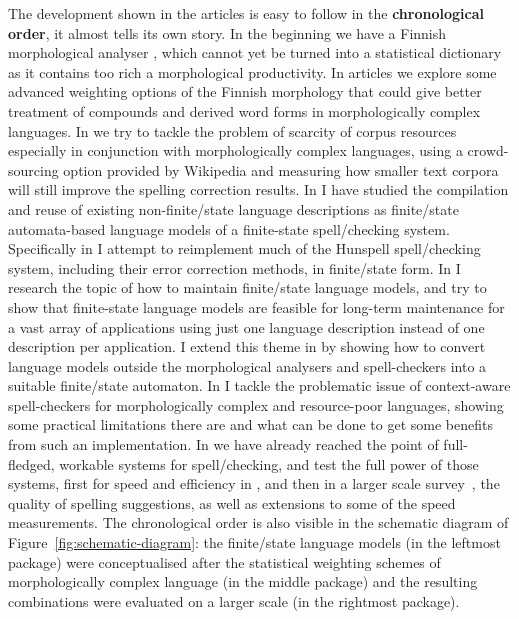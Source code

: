 \documentclass[officiallayout]{unihelcompling}
\begin{document}
The development shown in the articles is easy to follow in the
\textbf{chronological order}, it almost tells its own story. In the beginning
we have a Finnish morphological analyser \citep{pirinen2008suomen}, which
cannot yet be turned into a statistical dictionary as it contains too rich a
morphological productivity. In articles
 we explore some advanced
weighting options of the Finnish morphology that could give better treatment of
compounds and derived word forms in morphologically complex languages. In
 we try to tackle the problem of scarcity of
corpus resources especially in conjunction with morphologically complex
languages, using a crowd-sourcing option provided by Wikipedia and measuring
how smaller text corpora will still improve the spelling correction results. In
 I have studied the
compilation and reuse of existing non-finite\-/state language descriptions as
finite\-/state automata-based language models of a finite-state spell\-/checking
system.  Specifically in  I attempt to
reimplement much of the Hunspell spell\-/checking system, including their error
correction methods, in finite\-/state form. In
 I research the topic of how to maintain
finite\-/state language models, and try to show that finite-state language models
are feasible for long-term maintenance for a vast array of applications using
just one language description instead of one description per application.  I
extend this theme in  by showing how to
convert language models outside the morphological analysers and spell-checkers
into a suitable finite\-/state automaton. In  I
tackle the problematic issue of context-aware spell-checkers for
morphologically complex and resource-poor languages, showing some practical
limitations there are and what can be done to get some benefits from such an
implementation. In  we have
already reached the point of full-fledged, workable systems for
spell\-/checking, and test the full power of those systems, first for speed and
efficiency in , and then in a larger scale
survey~, the quality of spelling suggestions, as
well as extensions to some of the speed measurements.  The chronological order
is also visible in the schematic diagram of Figure~\ref{fig:schematic-diagram}:
the finite\-/state language models (in the leftmost package) were conceptualised
after the statistical weighting schemes of morphologically complex language (in
the middle package) and the resulting combinations were evaluated on a larger
scale (in the rightmost package).
\end{document}
